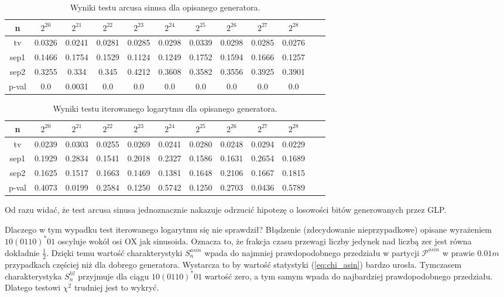 \documentclass[a4paper,11pt,twoside]{book}
\newcommand{\Slil}[1]{S^{lil}_#1}
\newcommand{\Sasin}[1]{S^{asin}_#1}
\theoremstyle{definition}
\begin{document}
\begin{table}[ht!]
\centering
 \caption{Wyniki testu arcusa sinusa dla opisanego generatora.}
 \label{tab:zep_asin}
\begin{tabular} {||c|c|c|c|c|c|c|c|c|c|c|c||}  
 \hline
     n  &  $2^{20}$ &  $2^{21}$ &  $2^{22}$ &  $2^{23}$ &  $2^{24}$ &  $2^{25}$ &  $2^{26}$ &  $2^{27}$ &  $2^{28}$\\ \hline
     tv &  0.0326 &  0.0241 &  0.0281 &  0.0285 &  0.0298 &  0.0339 &  0.0298 &  0.0285 &  0.0276\\ \hline
   sep1 &  0.1466 &  0.1754 &  0.1529 &  0.1124 &  0.1249 &  0.1752 &  0.1594 &  0.1666 &  0.1257\\ \hline
   sep2 &  0.3255 &   0.334 &   0.345 &  0.4212 &  0.3608 &  0.3582 &  0.3556 &  0.3925 &  0.3901\\ \hline
  p-val &     0.0 &  0.0031 &     0.0 &     0.0 &     0.0 &     0.0 &     0.0 &     0.0 &     0.0\\ \hline
\end{tabular}  
\end{table}
\begin{table}[ht!]
\centering
 \caption{Wyniki testu iterowanego logarytmu dla opisanego generatora.}
 \label{tab:zep_lil}
\begin{tabular} {||c|c|c|c|c|c|c|c|c|c|c|c||}  
 \hline 
     n  &  $2^{20}$ &  $2^{21}$ &  $2^{22}$ &  $2^{23}$ &  $2^{24}$ &  $2^{25}$ &  $2^{26}$ &  $2^{27}$ &  $2^{28}$\\ \hline
     tv &  0.0239 &  0.0303 &  0.0255 &  0.0269 &  0.0241 &  0.0280 &  0.0248 &  0.0294 &  0.0229\\ \hline
   sep1 &  0.1929 &  0.2834 &  0.1541 &  0.2018 &  0.2327 &  0.1586 &  0.1631 &  0.2654 &  0.1689\\ \hline
   sep2 &  0.1625 &  0.1517 &  0.1663 &  0.1469 &  0.1381 &  0.1648 &  0.2106 &  0.1667 &  0.1815\\ \hline
  p-val &  0.4073 &  0.0199 &  0.2584 &  0.1250 &  0.5742 &  0.1250 &  0.2703 &  0.0436 &  0.5789\\ \hline
\end{tabular}  
\end{table}
Od razu widać, że test arcusa sinusa jednoznacznie nakazuje odrzucić hipotezę o losowości bitów generowanych przez GLP.

Dlaczego w tym wypadku test iterowanego logarytmu się nie sprawdził? Błądzenie (zdecydowanie nieprzypadkowe) opisane wyrażeniem $10(0110)^*01$ oscyluje wokół osi OX jak sinusoida. Oznacza to, że frakcja czasu przewagi liczby jedynek nad liczbą zer jest równa dokładnie $\frac{1}{2}$. Dzięki temu wartość charakterystyki $\Sasin{n}$ wpada do najmniej prawdopodobnego przedziału w partycji $\mathcal{P}^{asin}$ w prawie $0.01m$ przypadkach częściej niż dla dobrego generatora. Wystarcza to by wartość statystyki (\ref{eq:chi_asin}) bardzo urosła. Tymczasem charakterystyka $\Slil{n}$ przyjmuje dla ciągu $10(0110)^*01$ wartość zero, a tym samym wpada do najbardziej prawdopodobnego przedziału. Dlatego testowi $\chi^2$ trudniej jest to wykryć.
\end{document}
